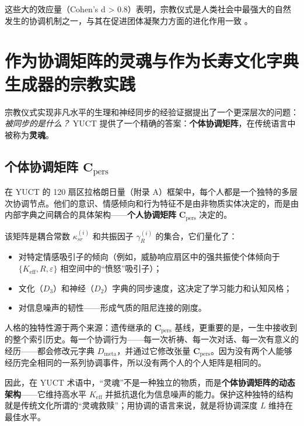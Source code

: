 \documentclass[12pt,a4paper]{article}
\begin{document}
	这些大的效应量（Cohen's d > 0.8）表明，宗教仪式是人类社会中最强大的自然发生的协调机制之一，与其在促进团体凝聚力方面的进化作用一致 \cite{Norenzayan2016}。
	
	\section{作为协调矩阵的灵魂与作为长寿文化字典生成器的宗教实践}
	\label{sec:soul-matrix}
	
	宗教仪式实现非凡水平的生理和神经同步的经验证据提出了一个更深层次的问题：\emph{被同步的是什么？} YUCT 提供了一个精确的答案：\textbf{个体协调矩阵}，在传统语言中被称为\textbf{灵魂}。
	
	\subsection{个体协调矩阵 \(\mathbf{C}_{\text{pers}}\)}
	
	在 YUCT 的 120 扇区拉格朗日量（附录 A）框架中，每个人都是一个独特的多层次协调节点。他们的意识、情感倾向和行为特征不是由非物质实体决定的，而是由内部字典之间耦合的具体架构——\textbf{个人协调矩阵} \(\mathbf{C}_{\text{pers}}\) 决定的。
	
	该矩阵是耦合常数 \(\kappa_{sr}^{(i)}\) 和共振因子 \(\gamma_{R}^{(i)}\) 的集合，它们量化了：
	\begin{itemize}
		\item 对特定情感吸引子的倾向（例如，威胁响应扇区中的强共振使个体倾向于 \(\{K_{\mathrm{eff}}, R, \varepsilon\}\) 相空间中的“愤怒”吸引子）；
		\item 文化（\(D_3\)）和神经（\(D_2\)）字典的同步速度，这决定了学习能力和认知风格；
		\item 对信息噪声的韧性——形成气质的阻尼连接的刚度。
	\end{itemize}
	
	人格的独特性源于两个来源：遗传继承的 \(\mathbf{C}_{\text{pers}}\) 基线，更重要的是，一生中接收到的整个索引历史。每一个协调行为——每一次祈祷、每一次对话、每一次有意义的经历——都会修改元字典 \(D_{\text{meta}}\)，并通过它修改张量 \(\mathbf{C}_{\text{pers}}\)。因为没有两个人能够经历完全相同的一系列协调事件，所以没有两个人的个人矩阵是相同的。
	
	因此，在 YUCT 术语中，“灵魂”不是一种独立的物质，而是\textbf{个体协调矩阵的动态架构}——它维持高水平 \(K_{\mathrm{eff}}\) 并抵抗退化为信息噪声的能力。保护这种独特的结构就是传统文化所谓的“灵魂救赎”；用协调的语言来说，就是将协调深度 \(L\) 维持在最佳水平。
	
\end{document}
